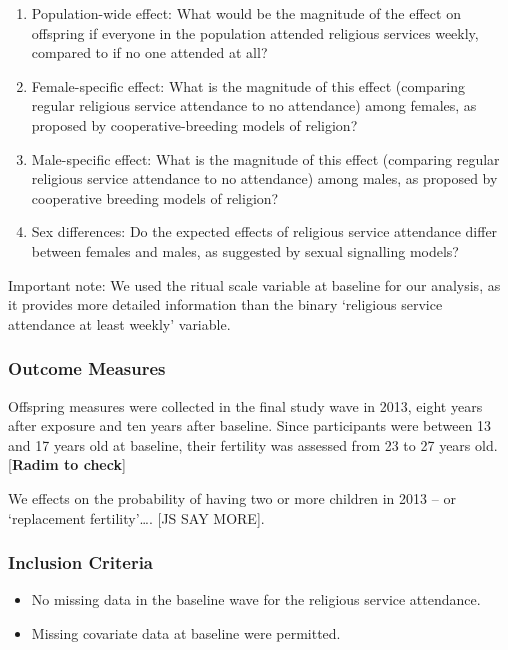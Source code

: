 \documentclass[
  single column]{article}
\providecommand{\tightlist}{%
  \setlength{\itemsep}{0pt}\setlength{\parskip}{0pt}}\usepackage{longtable,booktabs,array}
\begin{document}
\begin{enumerate}
\def\labelenumi{\arabic{enumi}.}
\item
  Population-wide effect: What would be the magnitude of the effect on
  offspring if everyone in the population attended religious services
  weekly, compared to if no one attended at all?
\item
  Female-specific effect: What is the magnitude of this effect
  (comparing regular religious service attendance to no attendance)
  among females, as proposed by cooperative-breeding models of religion?
\item
  Male-specific effect: What is the magnitude of this effect (comparing
  regular religious service attendance to no attendance) among males, as
  proposed by cooperative breeding models of religion?
\item
  Sex differences: Do the expected effects of religious service
  attendance differ between females and males, as suggested by sexual
  signalling models?
\end{enumerate}

Important note: We used the ritual scale variable at baseline for our
analysis, as it provides more detailed information than the binary
`religious service attendance at least weekly' variable.

\subsubsection{Outcome Measures}\label{outcome-measures}

Offspring measures were collected in the final study wave in 2013, eight
years after exposure and ten years after baseline. Since participants
were between 13 and 17 years old at baseline, their fertility was
assessed from 23 to 27 years old. {[}\textbf{Radim to check}{]}

We effects on the probability of having two or more children in 2013 --
or `replacement fertility'\ldots. {[}JS SAY MORE{]}.

\subsubsection{Inclusion Criteria}\label{inclusion-criteria}

\begin{itemize}
\tightlist
\item
  No missing data in the baseline wave for the religious service
  attendance.
\item
  Missing covariate data at baseline were permitted.
\end{itemize}
\end{document}
